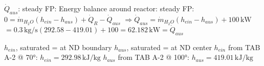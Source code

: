\( \dot{Q}_{aus} \): steady FP:  
Energy balance around reactor: steady FP:  
\( 0 = \dot{m}_{H_2O} (h_{ein} - h_{aus}) + \dot{Q}_R - \dot{Q}_{aus} \)  
\( \Rightarrow \dot{Q}_{aus} = \dot{m}_{H_2O} (h_{ein} - h_{aus}) + 100 \, \text{kW} \)  
\( = 0.3 \, \text{kg/s} (292.58 - 419.01) + 100 = 62.182 \, \text{kW} = \dot{Q}_{aus} \)  

\( h_{ein} \), saturated = at ND boundary  
\( h_{aus} \), saturated = at ND center  
\( h_{ein} \) from TAB A-2 @ 70°: \( h_{ein} = 292.98 \, \text{kJ/kg} \)  
\( h_{aus} \) from TAB A-2 @ 100°: \( h_{aus} = 419.01 \, \text{kJ/kg} \)